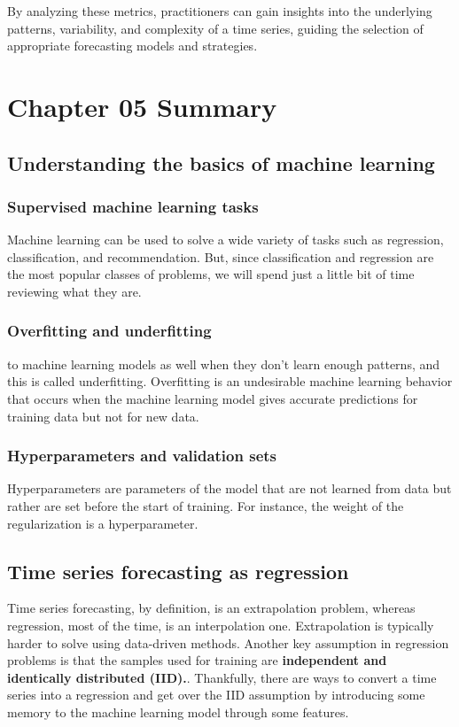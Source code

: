 \documentclass{article}
\begin{document}
By analyzing these metrics, practitioners can gain insights into the underlying patterns, variability, and complexity of a time series, guiding the selection of appropriate forecasting models and strategies.

\section{Chapter 05 Summary}

\subsection{Understanding the basics of machine learning}
\subsubsection{Supervised machine learning tasks}
Machine learning can be used to solve a wide variety of tasks such as regression, classification, and recommendation. But, since classification and regression are the most popular classes of problems, we will spend just a little bit of time reviewing what they are.
\subsubsection{Overfitting and underfitting}
to machine learning models as well when they don’t learn enough patterns, and this is called underfitting.
Overfitting is an undesirable machine learning behavior that occurs when the machine learning model gives accurate predictions for training data but not for new data.
\subsubsection{Hyperparameters and validation sets}
Hyperparameters are parameters of the model that are not learned from data but rather are set before the start of training. For instance, the weight of the regularization is a hyperparameter.

\subsection{Time series forecasting as regression}
Time series forecasting, by definition, is an extrapolation problem, whereas regression, most of the time, is an interpolation one. Extrapolation is typically harder to solve using data-driven methods. Another key assumption in regression problems is that the samples used for training are \textbf{independent and identically distributed (IID).}. Thankfully, there are ways to convert a time series into a regression and
get over the IID assumption by introducing some memory to the machine learning model through
some features.
\end{document}
